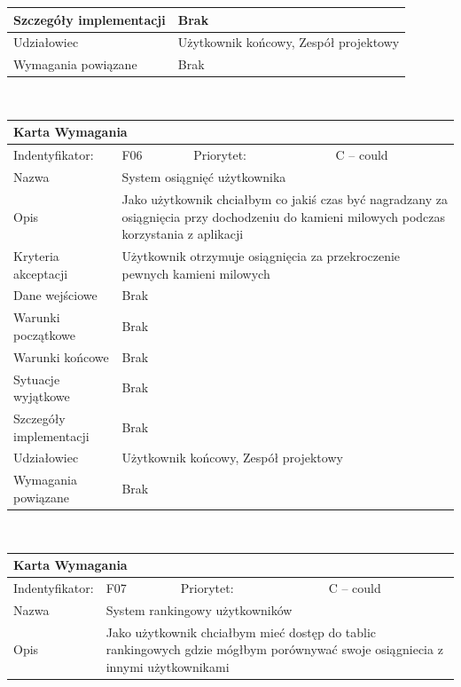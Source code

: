 \documentclass[a4paper,11pt]{report}
\begin{document}
\begin{itemize}
\begin{itemize}
\begin{tabular}{|p{3cm}|p{2cm}|p{2cm}|p{6cm}|}
		\hline
		Szczegóły implementacji & \multicolumn{3}{|p{10 cm}|}{Brak}\\
		\hline
		Udziałowiec & \multicolumn{3}{|p{10 cm}|}{Użytkownik końcowy, Zespół projektowy}\\
		\hline
		Wymagania powiązane & \multicolumn{3}{|p{10 cm}|}{Brak}\\
		\hline
		\end{tabular}\\
		\begin{tabular}{|p{3cm}|p{2cm}|p{2cm}|p{6cm}|}
		\hline
		\multicolumn{4}{|p{12 cm}|}{Karta Wymagania}\\
		\hline
		Indentyfikator: & F06 & Priorytet: & C – could \\
		\hline
		Nazwa & \multicolumn{3}{|p{10 cm}|}{System osiągnięć użytkownika}\\
		\hline
		Opis & \multicolumn{3}{|p{10 cm}|}{Jako użytkownik chciałbym co jakiś czas być nagradzany za osiągnięcia przy dochodzeniu do kamieni milowych podczas korzystania z aplikacji}\\
		\hline
		Kryteria akceptacji & \multicolumn{3}{|p{10 cm}|}{Użytkownik otrzymuje osiągnięcia za przekroczenie pewnych kamieni milowych}\\
		\hline
		Dane wejściowe & \multicolumn{3}{|p{10 cm}|}{Brak}\\
		\hline
		Warunki początkowe & \multicolumn{3}{|p{10 cm}|}{Brak}\\
		\hline
		Warunki końcowe & \multicolumn{3}{|p{10 cm}|}{Brak}\\
		\hline
		Sytuacje wyjątkowe & \multicolumn{3}{|p{10 cm}|}{Brak}\\
		\hline
		Szczegóły implementacji & \multicolumn{3}{|p{10 cm}|}{Brak}\\
		\hline
		Udziałowiec & \multicolumn{3}{|p{10 cm}|}{Użytkownik końcowy, Zespół projektowy}\\
		\hline
		Wymagania powiązane & \multicolumn{3}{|p{10 cm}|}{Brak}\\
		\hline
		\end{tabular}\\
		\begin{tabular}{|p{3cm}|p{2cm}|p{2cm}|p{6cm}|}
		\hline
		\multicolumn{4}{|p{12 cm}|}{Karta Wymagania}\\
		\hline
		Indentyfikator: & F07 & Priorytet: & C – could\\
		\hline
		Nazwa & \multicolumn{3}{|p{10 cm}|}{System rankingowy użytkowników}\\
		\hline
		Opis & \multicolumn{3}{|p{10 cm}|}{Jako użytkownik chciałbym mieć dostęp do tablic rankingowych gdzie mógłbym porównywać swoje osiągniecia z innymi użytkownikami }\\

\end{tabular}
\end{itemize}
\end{itemize}
\end{document}

